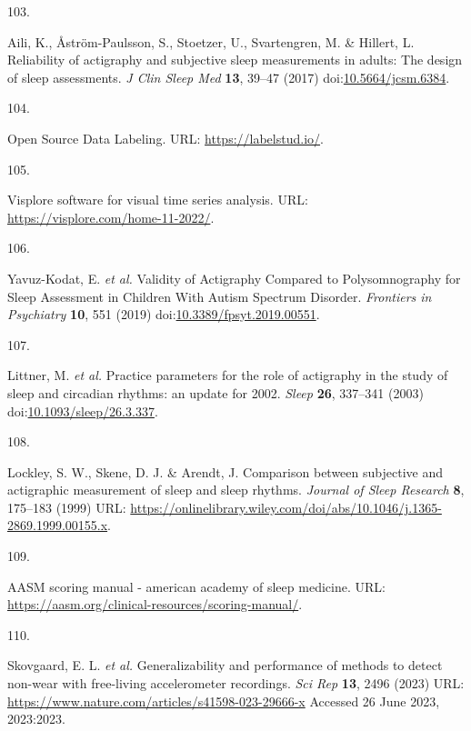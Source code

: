 \documentclass[
  9pt,
]{scrbook}
\newlength{\cslhangindent}
\newlength{\csllabelwidth}
\newlength{\cslentryspacingunit} %
\newenvironment{CSLReferences}[2] %
 {%
  \setlength{\parindent}{0pt}
  \ifodd #1
  \let\oldpar\par
  \def\par{\hangindent=\cslhangindent\oldpar}
  \fi
  \setlength{\parskip}{#2\cslentryspacingunit}
 }%
 {}
\newcommand{\CSLLeftMargin}[1]{\parbox[t]{\csllabelwidth}{#1}}
\newcommand{\CSLRightInline}[1]{\parbox[t]{\linewidth - \csllabelwidth}{#1}\break}
\begin{document}
\begin{CSLReferences}{0}{0}
\leavevmode{}%
\CSLLeftMargin{103. }%
\CSLRightInline{Aili, K., Åström-Paulsson, S., Stoetzer, U.,
Svartengren, M. \& Hillert, L. Reliability of actigraphy and subjective
sleep measurements in adults: The design of sleep assessments. \emph{J
Clin Sleep Med} \textbf{13}, 39--47 (2017)
doi:\href{https://doi.org/10.5664/jcsm.6384}{10.5664/jcsm.6384}.}

\leavevmode{}%
\CSLLeftMargin{104. }%
\CSLRightInline{Open Source Data Labeling. URL:
\url{https://labelstud.io/}.}

\leavevmode{}%
\CSLLeftMargin{105. }%
\CSLRightInline{Visplore {\textendash} software for visual time series
analysis. URL: \url{https://visplore.com/home-11-2022/}.}

\leavevmode{}%
\CSLLeftMargin{106. }%
\CSLRightInline{Yavuz-Kodat, E. \emph{et al.} Validity of Actigraphy
Compared to Polysomnography for Sleep Assessment in Children With Autism
Spectrum Disorder. \emph{Frontiers in Psychiatry} \textbf{10}, 551
(2019)
doi:\href{https://doi.org/10.3389/fpsyt.2019.00551}{10.3389/fpsyt.2019.00551}.}

\leavevmode{}%
\CSLLeftMargin{107. }%
\CSLRightInline{Littner, M. \emph{et al.} Practice parameters for the
role of actigraphy in the study of sleep and circadian rhythms: an
update for 2002. \emph{Sleep} \textbf{26}, 337--341 (2003)
doi:\href{https://doi.org/10.1093/sleep/26.3.337}{10.1093/sleep/26.3.337}.}

\leavevmode{}%
\CSLLeftMargin{108. }%
\CSLRightInline{Lockley, S. W., Skene, D. J. \& Arendt, J. Comparison
between subjective and actigraphic measurement of sleep and sleep
rhythms. \emph{Journal of Sleep Research} \textbf{8}, 175--183 (1999)
URL:
\url{https://onlinelibrary.wiley.com/doi/abs/10.1046/j.1365-2869.1999.00155.x}.}

\leavevmode{}%
\CSLLeftMargin{109. }%
\CSLRightInline{AASM scoring manual - american academy of sleep
medicine. URL:
\url{https://aasm.org/clinical-resources/scoring-manual/}.}

\leavevmode{}%
\CSLLeftMargin{110. }%
\CSLRightInline{Skovgaard, E. L. \emph{et al.} Generalizability and
performance of methods to detect non-wear with free-living accelerometer
recordings. \emph{Sci Rep} \textbf{13}, 2496 (2023) URL:
\url{https://www.nature.com/articles/s41598-023-29666-x} Accessed 26
June 2023, 2023:2023.}


\end{CSLReferences}
\end{document}
